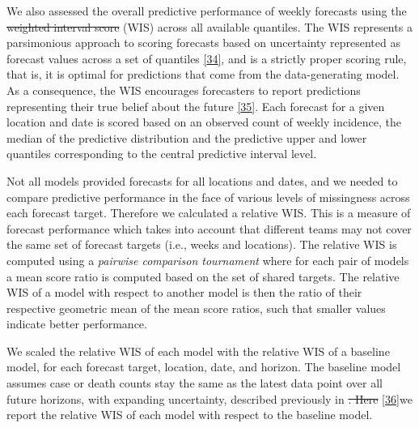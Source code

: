 \documentclass[
]{article}
\providecommand{\DIFaddtex}[1]{{\protect\color{blue}\uwave{#1}}} %
\providecommand{\DIFdeltex}[1]{{\protect\color{red}\sout{#1}}}                      %
\providecommand{\DIFaddbegin}{} %
\providecommand{\DIFaddend}{} %
\providecommand{\DIFdelbegin}{} %
\providecommand{\DIFdelend}{} %
\providecommand{\DIFadd}[1]{\texorpdfstring{\DIFaddtex{#1}}{#1}} %
\providecommand{\DIFdel}[1]{\texorpdfstring{\DIFdeltex{#1}}{}} %
\newcommand{\DIFscaledelfig}{0.5}
\newlength{\DIFdelgraphicswidth} %
\newlength{\DIFdelgraphicsheight} %
\newcommand{\DIFaddincludegraphics}[2][]{{\color{blue}\fbox{\DIFOincludegraphics[#1]{#2}}}} %
\newcommand{\DIFdelincludegraphics}[2][]{%
\sbox{\DIFdelgraphicsbox}{\DIFOincludegraphics[#1]{#2}}%
\settoboxwidth{\DIFdelgraphicswidth}{\DIFdelgraphicsbox} %
\settoboxtotalheight{\DIFdelgraphicsheight}{\DIFdelgraphicsbox} %
\scalebox{\DIFscaledelfig}{%
\parbox[b]{\DIFdelgraphicswidth}{\usebox{\DIFdelgraphicsbox}\\[-\baselineskip] \rule{\DIFdelgraphicswidth}{0em}}\llap{\resizebox{\DIFdelgraphicswidth}{\DIFdelgraphicsheight}{%
\setlength{\unitlength}{\DIFdelgraphicswidth}%
\begin{picture}(1,1)%
\thicklines\linethickness{2pt} %
{\color[rgb]{1,0,0}\put(0,0){\framebox(1,1){}}}%
{\color[rgb]{1,0,0}\put(0,0){\line( 1,1){1}}}%
{\color[rgb]{1,0,0}\put(0,1){\line(1,-1){1}}}%
\end{picture}%
}\hspace*{3pt}}} %
} %
\DeclareRobustCommand{\DIFaddbegin}{\DIFOaddbegin \let\includegraphics\DIFaddincludegraphics} %
\DeclareRobustCommand{\DIFaddend}{\DIFOaddend \let\includegraphics\DIFOincludegraphics} %
\DeclareRobustCommand{\DIFdelbegin}{\DIFOdelbegin \let\includegraphics\DIFdelincludegraphics} %
\DeclareRobustCommand{\DIFdelend}{\DIFOaddend \let\includegraphics\DIFOincludegraphics} %
\begin{document}
We also assessed the overall predictive performance of weekly forecasts using the \DIFdelbegin \DIFdel{weighted interval score }\DIFdelend \DIFaddbegin \DIFadd{Weighted Interval Score\textasciitilde}\DIFaddend (WIS) across all available quantiles. The WIS represents a parsimonious approach to scoring forecasts based on uncertainty represented as forecast values across a set of quantiles \protect\DIFdelbegin %
\DIFdelend \DIFaddbegin \hyperlink{ref-bracherEvaluatingEpidemicForecasts2021}{{[}34{]}}\DIFaddend , and is a strictly proper scoring rule, that is, it is optimal for predictions that come from the data-generating model. As a consequence, the WIS encourages forecasters to report predictions representing their true belief about the future \protect\DIFdelbegin %
\DIFdelend \DIFaddbegin \hyperlink{ref-gneitingStrictlyProperScoring2007}{{[}35{]}}\DIFaddend . Each forecast for a given location and date is scored based on an observed count of weekly incidence, the median of the predictive distribution and the predictive upper and lower quantiles corresponding to the central predictive interval level.

Not all models provided forecasts for all locations and dates, and we needed to compare predictive performance in the face of various levels of missingness across each forecast target. Therefore we calculated a relative WIS. This is a measure of forecast performance which takes into account that different teams may not cover the same set of forecast targets (i.e., weeks and locations). The relative WIS is computed using a \emph{pairwise comparison tournament} where for each pair of models a mean score ratio is computed based on the set of shared targets. The relative WIS of a model with respect to another model is then the ratio of their respective geometric mean of the mean score ratios, such that smaller values indicate better performance.

We scaled the relative WIS of each model with the relative WIS of a baseline model, for each forecast target, location, date, and horizon. The baseline model assumes case or death counts stay the same as the latest data point over all future horizons, with expanding uncertainty, described previously in \protect\DIFdelbegin %
\DIFdel{. Here }\DIFdelend \DIFaddbegin \hyperlink{ref-cramerEvaluationIndividualEnsemble2021}{{[}36{]}}\DIFadd{. In this study }\DIFaddend we report the relative WIS of each model with respect to the baseline model.
\end{document}
